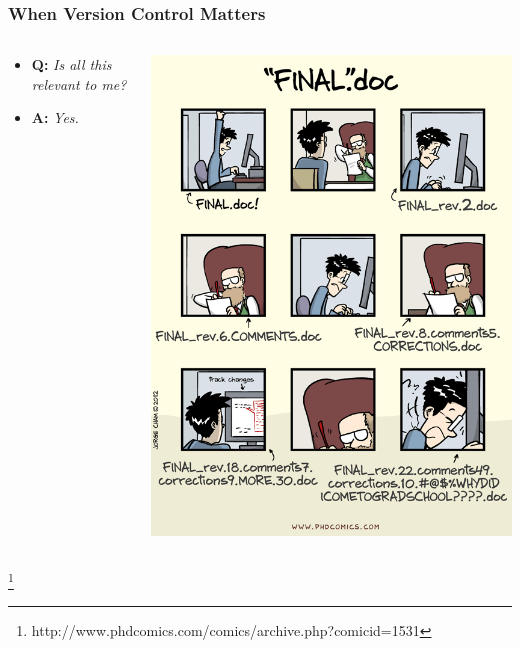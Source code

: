 \documentclass{beamer}
\begin{document}
\begin{frame} %
  \frametitle{When Version Control Matters}
  
  \begin{columns}
    \begin{column}{.5\textwidth}
      \begin{itemize}
      \item \textbf{Q:} \textit{Is all this relevant to me?}
      \item \textbf{A:} \textit{Yes.}
      \end{itemize} 
    \end{column}
    
    \begin{column}{.5\textwidth}
        \centering
        \includegraphics[height=.8\textheight]{img/final} 
    \end{column}
  \end{columns}
  \footnote{http://www.phdcomics.com/comics/archive.php?comicid=1531}
\end{frame}
\end{document}
